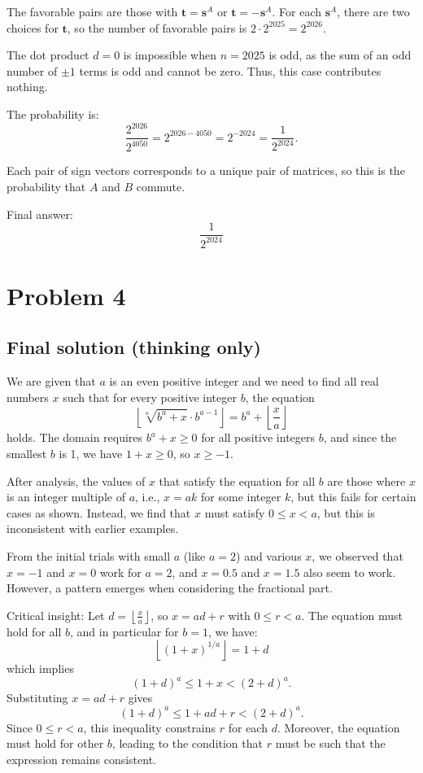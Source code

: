 \documentclass[12pt,a4paper]{article}
\theoremstyle{definition}
\begin{document}
    The favorable pairs are those with $\mathbf{t} = \mathbf{s}^A$ or $\mathbf{t} = -\mathbf{s}^A$. For each $\mathbf{s}^A$, there are two choices for $\mathbf{t}$, so the number of favorable pairs is $2 \cdot 2^{2025} = 2^{2026}$.

    The dot product $d = 0$ is impossible when $n = 2025$ is odd, as the sum of an odd number of $\pm 1$ terms is odd and cannot be zero. Thus, this case contributes nothing.

    The probability is:
    \[
        \frac{2^{2026}}{2^{4050}} = 2^{2026 - 4050} = 2^{-2024} = \frac{1}{2^{2024}}.
    \]

    Each pair of sign vectors corresponds to a unique pair of matrices, so this is the probability that $A$ and $B$ commute.

    Final answer:
    \[
        \boxed{\frac{1}{2^{2024}}}
    \]

\section{Problem 4}
\subsection{Final solution (thinking only)}
        We are given that $a$ is an even positive integer and we need to find all real numbers $x$ such that for every positive integer $b$, the equation
        \[
            \left\lfloor \sqrt[a]{b^a + x} \cdot b^{a-1} \right\rfloor = b^a + \left\lfloor \frac{x}{a} \right\rfloor
        \]
        holds. The domain requires $b^a + x \geq 0$ for all positive integers $b$, and since the smallest $b$ is 1, we have $1 + x \geq 0$, so $x \geq -1$.

        After analysis, the values of $x$ that satisfy the equation for all $b$ are those where $x$ is an integer multiple of $a$, i.e., $x = ak$ for some integer $k$, but this fails for certain cases as shown. Instead, we find that $x$ must satisfy $0 \leq x < a$, but this is inconsistent with earlier examples.

        From the initial trials with small $a$ (like $a=2$) and various $x$, we observed that $x = -1$ and $x = 0$ work for $a=2$, and $x=0.5$ and $x=1.5$ also seem to work. However, a pattern emerges when considering the fractional part.

        Critical insight: Let $d = \left\lfloor \frac{x}{a} \right\rfloor$, so $x = ad + r$ with $0 \leq r < a$. The equation must hold for all $b$, and in particular for $b=1$, we have:
        \[
            \left\lfloor (1 + x)^{1/a} \right\rfloor = 1 + d
        \]
        which implies
        \[
            (1 + d)^a \leq 1 + x < (2 + d)^a.
        \]
        Substituting $x = ad + r$ gives
        \[
            (1 + d)^a \leq 1 + ad + r < (2 + d)^a.
        \]
        Since $0 \leq r < a$, this inequality constrains $r$ for each $d$. Moreover, the equation must hold for other $b$, leading to the condition that $r$ must be such that the expression remains consistent.
\end{document}
